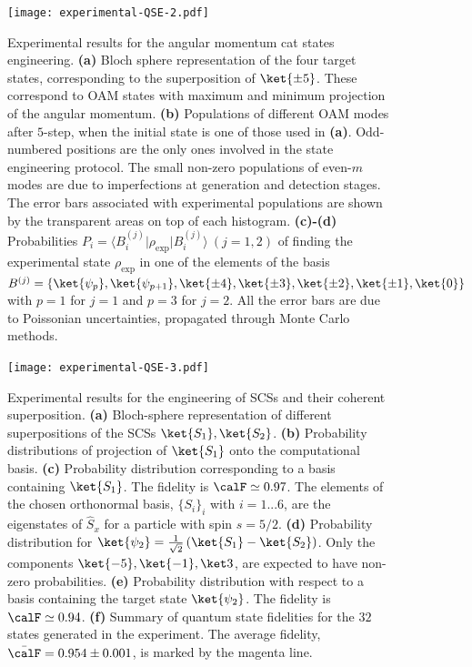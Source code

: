 \begin{figure}[tb]
\texttt{[image: experimental-QSE-2.pdf]}
\caption{
	Experimental results for the angular momentum cat states engineering.
	\textbf{(a)} Bloch sphere representation of the four target states, corresponding to the superposition of $\ket{\pm 5}$. These correspond to \ac{OAM} states with maximum and minimum projection of the angular momentum.
	\textbf{(b)}
	Populations of different \ac{OAM} modes after $5$-step, when the initial state is one of those used in \textbf{(a)}. Odd-numbered positions are the only ones involved in the state engineering protocol. The small non-zero populations of even-$m$ modes are due to imperfections at generation and detection stages. The error bars associated with experimental populations are shown by the transparent areas on top of each histogram.
	\textbf{(c)-(d)} Probabilities $P_i=\langle B^{(j)}_i\vert\rho_\text{exp}\vert B^{(j)}_i\rangle~(j=1,2)$ of finding the experimental state $\rho_\text{exp}$ in one of the elements of the basis $B^{(j)}=\{\ket{\psi_p},\ket{\psi_{p+1}},\ket{\pm4},\ket{\pm3},\ket{\pm2},\ket{\pm1},\ket{0}\}$ with $p=1$ for $j=1$ and $p=3$ for $j=2$. All the error bars are due to Poissonian uncertainties, propagated through Monte Carlo methods.
}
\label{fig:expQWs:results_cat_states}
\end{figure}

\begin{figure}[tb]
\texttt{[image: experimental-QSE-3.pdf]}
\caption{
	Experimental results for the engineering of \acp{SCS} and their coherent superposition.
	\textbf{(a)} Bloch-sphere representation of different superpositions of the \acp{SCS} $\ket{S_1}, \ket{S_2}$.
	\textbf{(b)} Probability distributions of projection of $\ket{S_1}$ onto the computational basis.
	\textbf{(c)} Probability distribution corresponding to a basis containing $\ket{S_1}$. The fidelity is $\calF\simeq 0.97$.
	The elements of the chosen orthonormal basis, $\{S_i\}_i$ with $i=1 ...6$, are the eigenstates of $\hat{S}_x$ for a particle with spin $s=5/2$.
	\textbf{(d)} Probability distribution for $\ket{\psi_2}=\frac{1}{\sqrt{2}}\left(\ket{S_1}- \ket{S_2} \right)$. Only the components $\ket{-5}, \ket{-1}, \ket3$, are expected to have non-zero probabilities.
	\textbf{(e)} Probability distribution with respect to a basis containing the target state $\ket{\psi_2}$.
	The fidelity is $\calF\simeq 0.94$.
	\textbf{(f)} Summary of quantum state fidelities for the $32$ states generated in the experiment. The average fidelity, $\bar{\calF}=0.954\pm 0.001$, is marked by the magenta line.
}
\label{fig:VVBs:results_SCS_states}
\end{figure}

